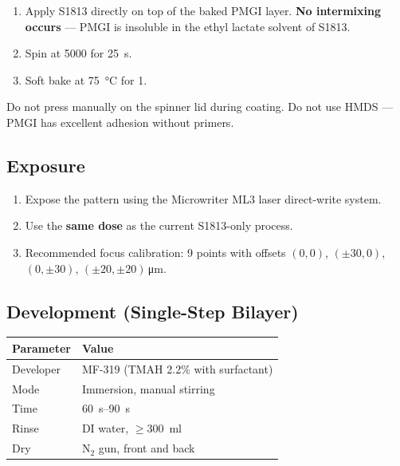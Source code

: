 \documentclass[11pt,a4paper]{article}
\begin{document}
\begin{enumerate}[label=\alph*)]
    \item Apply S1813 directly on top of the baked PMGI layer.
          \textbf{No intermixing occurs} --- PMGI is insoluble in the
          ethyl lactate solvent of S1813.
    \item Spin at \SI{5000}{\rpm} for \SI{25}{\s}.
    \item Soft bake at \SI{75}{\celsius} for \SI{1}{\min}.
\end{enumerate}

\begin{warningbox}[Do Not]
Do not press manually on the spinner lid during coating. Do not use
HMDS --- PMGI has excellent adhesion without primers.
\end{warningbox}

\subsection{Exposure}

\begin{enumerate}[label=\alph*)]
    \item Expose the pattern using the Microwriter ML3 laser direct-write
          system.
    \item Use the \textbf{same dose} as the current S1813-only process.
    \item Recommended focus calibration: 9 points with offsets
          $(0,0)$, $(\pm30,0)$, $(0,\pm30)$, $(\pm20,\pm20)$\,\si{\micro\m}.
\end{enumerate}

\subsection{Development (Single-Step Bilayer)}

\begin{parambox}
\begin{tabular}{@{}ll@{}}
\toprule
\textbf{Parameter} & \textbf{Value} \\
\midrule
Developer & MF-319 (TMAH 2.2\% with surfactant) \\
Mode & Immersion, manual stirring \\
Time & \SIrange{60}{90}{\second} \\
Rinse & DI water, $\geq$\SI{300}{\ml} \\
Dry & N$_2$ gun, front and back \\
\bottomrule
\end{tabular}
\end{parambox}
\end{document}
